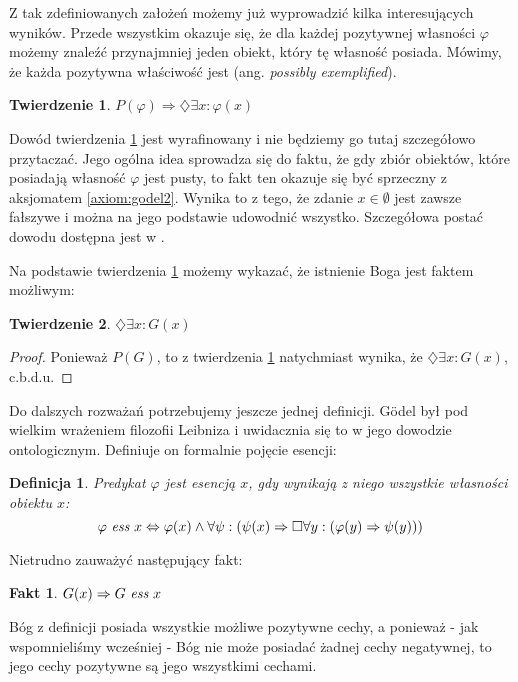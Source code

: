 \documentclass{article}
\newtheorem{definition-g}{Definicja}
\newtheorem{theorem-g}{Twierdzenie}
\newtheorem{corollary}{Fakt}
\begin{document}
Z tak zdefiniowanych założeń możemy już wyprowadzić kilka interesujących wyników. Przede wszystkim okazuje się, że dla każdej pozytywnej własności $\varphi$ możemy znaleźć przynajmniej jeden obiekt, który tę własność posiada. Mówimy, że każda pozytywna właściwość jest  (ang. \emph{possibly exemplified}). 
\begin{theorem-g} \label{th:godel1}
	$P(\varphi) \Rightarrow \diamondsuit \exists x: \varphi(x)$
\end{theorem-g}
Dowód twierdzenia \ref{th:godel1} jest wyrafinowany i nie będziemy go tutaj szczegółowo przytaczać. Jego ogólna idea sprowadza się do faktu, że gdy zbiór obiektów, które posiadają własność $\varphi$ jest pusty, to fakt ten okazuje się być sprzeczny z aksjomatem \ref{axiom:godel2}. Wynika to z tego, że zdanie $x \in \emptyset$ jest zawsze fałszywe i można na jego podstawie udowodnić wszystko. Szczegółowa postać dowodu dostępna jest w . 

Na podstawie twierdzenia \ref{th:godel1} możemy wykazać, że istnienie Boga jest faktem możliwym:
\begin{theorem-g} \label{th:godel2}
	$\diamondsuit \exists x: G(x)$
\end{theorem-g}
\begin{proof}
	Ponieważ $P(G)$, to z twierdzenia \ref{th:godel1} natychmiast wynika, że $\diamondsuit \exists x: G(x)$, c.b.d.u.
\end{proof}

Do dalszych rozważań potrzebujemy jeszcze jednej definicji. Gödel był pod wielkim wrażeniem filozofii Leibniza i uwidacznia się to w jego dowodzie ontologicznym. Definiuje on formalnie pojęcie esencji:
\begin{definition-g}
	Predykat $\varphi$ jest \emph{esencją} $x$, gdy wynikają z niego wszystkie własności obiektu $x$:
	\begin{equation*}
	\varphi\ \emph{ess}\ x \Leftrightarrow \varphi(x) \wedge \forall \psi: \left( \psi(x) \Rightarrow \Box \forall y: \left( \varphi(y) \Rightarrow \psi(y) \right) \right)
	\end{equation*}
\end{definition-g}
Nietrudno zauważyć następujący fakt:
\begin{corollary}
	$G(x) \Rightarrow G\ \emph{ess}\ x$
\end{corollary}
Bóg z definicji posiada wszystkie możliwe pozytywne cechy, a ponieważ - jak wspomnieliśmy wcześniej - Bóg nie może posiadać żadnej cechy negatywnej, to jego cechy pozytywne są jego wszystkimi cechami. 
\end{document}
